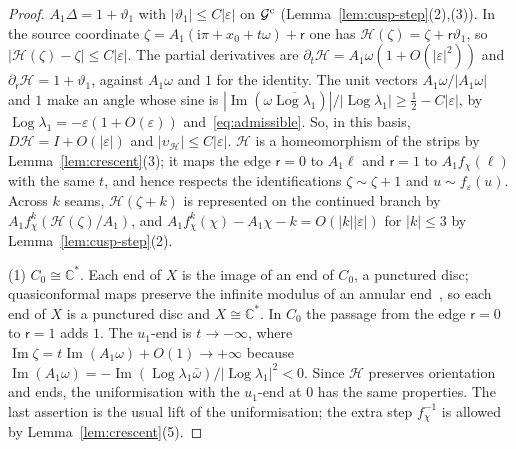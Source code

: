 \documentclass[11pt]{amsart}
\theoremstyle{definition}
\newcommand{\ii}{\mathrm{i}}
\begin{document}
\begin{proof}
$A_1\Delta=1+\vartheta_1$ with $|\vartheta_1|\le C|\varepsilon|$ on $\mathcal G^{\rm c}$
(Lemma~\ref{lem:cusp-step}(2),(3)).  In the source coordinate
$\zeta=A_1(\ii\pi+x_0+t\omega)+\mathsf r$ one has $\mathcal H(\zeta)=\zeta+\mathsf r\vartheta_1$, so
$|\mathcal H(\zeta)-\zeta|\le C|\varepsilon|$.  The partial derivatives are
$\partial_t\mathcal H=A_1\omega(1+O(|\varepsilon|^2))$ and $\partial_{\mathsf r}\mathcal H=1+\vartheta_1$, against
$A_1\omega$ and $1$ for the identity.  The unit vectors $A_1\omega/|A_1\omega|$ and $1$
make an angle whose sine is
$|\operatorname{Im}(\omega\overline{\operatorname{Log}\lambda_1})|/|\operatorname{Log}\lambda_1|\ge\tfrac12-C|\varepsilon|$, by
$\operatorname{Log}\lambda_1=-\varepsilon(1+O(\varepsilon))$ and~\eqref{eq:admissible}.  So, in this basis,
$D\mathcal H=I+O(|\varepsilon|)$ and $|\upsilon_{\mathcal H}|\le C|\varepsilon|$.  $\mathcal H$ is a homeomorphism
of the strips by Lemma~\ref{lem:crescent}(3); it maps the edge $\mathsf r=0$ to
$A_1\ell$ and $\mathsf r=1$ to $A_1f_\chi(\ell)$ with the same $t$, and hence respects the
identifications $\zeta\sim\zeta+1$ and $u\sim f_\varepsilon(u)$.  Across $k$ seams,
$\mathcal H(\zeta+k)$ is represented on the continued branch by
$A_1f_\chi^k(\mathcal H(\zeta)/A_1)$, and $A_1f_\chi^k(\chi)-A_1\chi-k=O(|k||\varepsilon|)$ for
$|k|\le3$ by Lemma~\ref{lem:cusp-step}(2).

(1) $C_0\cong\mathbb C^*$.  Each end of $X$ is the image of an end of $C_0$, a
punctured disc; quasiconformal maps preserve the infinite modulus of an
annular end~\cite{LehtoVirtanen}, so each end of $X$ is a punctured disc and
$X\cong\mathbb C^*$.  In $C_0$ the passage from the edge $\mathsf r=0$ to $\mathsf r=1$ adds $1$.
The $u_1$-end is $t\to-\infty$, where
$\operatorname{Im}\zeta=t\operatorname{Im}(A_1\omega)+O(1)\to+\infty$ because
$\operatorname{Im}(A_1\omega)=-\operatorname{Im}(\operatorname{Log}\lambda_1\bar\omega)/|\operatorname{Log}\lambda_1|^2<0$.  Since $\mathcal H$
preserves orientation and ends, the uniformisation with the $u_1$-end at $0$
has the same properties.  The last assertion is the usual lift of the
uniformisation; the extra step $f_\chi^{-1}$ is allowed by Lemma~\ref{lem:crescent}(5).


\end{proof}
\end{document}
